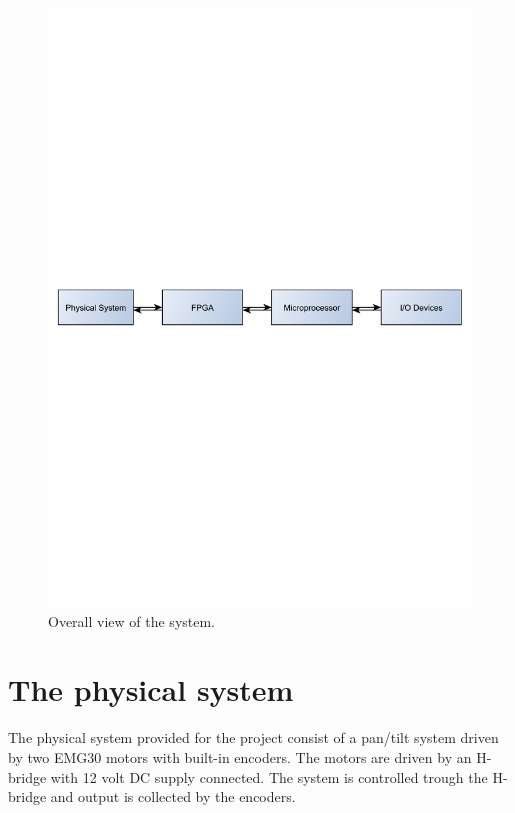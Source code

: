 \begin{figure}[htb]
\centering
\includegraphics[scale=0.56,trim=400 380 400 380]{graphics/firstsystem.pdf} %
\caption{Overall view of the system.}
\label{fig:firstsystem}	
\end{figure}

\section{The physical system}\label{sec:physicalsystem}
The physical system provided for the project consist of a pan/tilt system driven by two EMG30 \cite{emg30} motors with built-in encoders. The motors are driven by an H-bridge \cite{hbridge} with 12 volt DC supply connected. The system is controlled trough the H-bridge and output is collected by the encoders.

